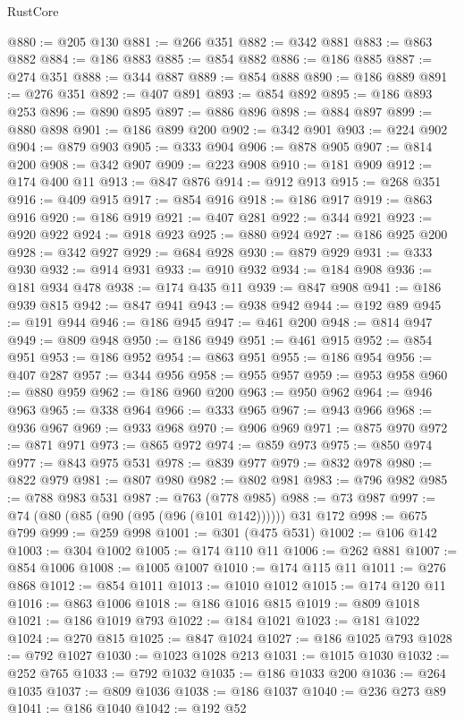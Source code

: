 \begin{lexlean}{RustCore}
\begin{coremodule}
@880 := @205 @130
@881 := @266 @351
@882 := @342 @881
@883 := @863 @882
@884 := @186 @883
@885 := @854 @882
@886 := @186 @885
@887 := @274 @351
@888 := @344 @887
@889 := @854 @888
@890 := @186 @889
@891 := @276 @351
@892 := @407 @891
@893 := @854 @892
@895 := @186 @893 @253
@896 := @890 @895
@897 := @886 @896
@898 := @884 @897
@899 := @880 @898
@901 := @186 @899 @200
@902 := @342 @901
@903 := @224 @902
@904 := @879 @903
@905 := @333 @904
@906 := @878 @905
@907 := @814 @200
@908 := @342 @907
@909 := @223 @908
@910 := @181 @909
@912 := @174 @400 @11
@913 := @847 @876
@914 := @912 @913
@915 := @268 @351
@916 := @409 @915
@917 := @854 @916
@918 := @186 @917
@919 := @863 @916
@920 := @186 @919
@921 := @407 @281
@922 := @344 @921
@923 := @920 @922
@924 := @918 @923
@925 := @880 @924
@927 := @186 @925 @200
@928 := @342 @927
@929 := @684 @928
@930 := @879 @929
@931 := @333 @930
@932 := @914 @931
@933 := @910 @932
@934 := @184 @908
@936 := @181 @934 @478
@938 := @174 @435 @11
@939 := @847 @908
@941 := @186 @939 @815
@942 := @847 @941
@943 := @938 @942
@944 := @192 @89
@945 := @191 @944
@946 := @186 @945
@947 := @461 @200
@948 := @814 @947
@949 := @809 @948
@950 := @186 @949
@951 := @461 @915
@952 := @854 @951
@953 := @186 @952
@954 := @863 @951
@955 := @186 @954
@956 := @407 @287
@957 := @344 @956
@958 := @955 @957
@959 := @953 @958
@960 := @880 @959
@962 := @186 @960 @200
@963 := @950 @962
@964 := @946 @963
@965 := @338 @964
@966 := @333 @965
@967 := @943 @966
@968 := @936 @967
@969 := @933 @968
@970 := @906 @969
@971 := @875 @970
@972 := @871 @971
@973 := @865 @972
@974 := @859 @973
@975 := @850 @974
@977 := @843 @975 @531
@978 := @839 @977
@979 := @832 @978
@980 := @822 @979
@981 := @807 @980
@982 := @802 @981
@983 := @796 @982
@985 := @788 @983 @531
@987 := @763 (@778 @985)
@988 := @73 @987
@997 := @74 (@80 (@85 (@90 (@95 (@96 (@101 @142)))))) @31 @172
@998 := @675 @799
@999 := @259 @998
@1001 := @301 (@475 @531)
@1002 := @106 @142
@1003 := @304 @1002
@1005 := @174 @110 @11
@1006 := @262 @881
@1007 := @854 @1006
@1008 := @1005 @1007
@1010 := @174 @115 @11
@1011 := @276 @868
@1012 := @854 @1011
@1013 := @1010 @1012
@1015 := @174 @120 @11
@1016 := @863 @1006
@1018 := @186 @1016 @815
@1019 := @809 @1018
@1021 := @186 @1019 @793
@1022 := @184 @1021
@1023 := @181 @1022
@1024 := @270 @815
@1025 := @847 @1024
@1027 := @186 @1025 @793
@1028 := @792 @1027
@1030 := @1023 @1028 @213
@1031 := @1015 @1030
@1032 := @252 @765
@1033 := @792 @1032
@1035 := @186 @1033 @200
@1036 := @264 @1035
@1037 := @809 @1036
@1038 := @186 @1037
@1040 := @236 @273 @89
@1041 := @186 @1040
@1042 := @192 @52

\end{coremodule}
\end{lexlean}
